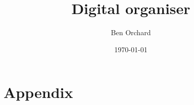 \newcommand{\addmylib}[1]{}
\newcommand{\addsrc}[1]{}

\addmylib{preamble}
\addmylib{annotate}
\addmylib{extra/tables}
\addmylib{extra/headers-footers}
\addmylib{custom/boxref}



\title{Digital organiser}
\author{Ben Orchard}

\date{\today}

\maketitle

\clearpage
\tableofcontents
\clearpage

\addsrc{analysis}
\clearpage
\addsrc{design}

\clearpage
\section{Appendix}
\addsrc{interview}


